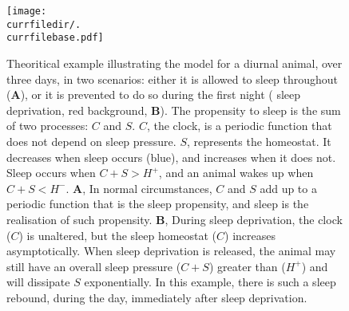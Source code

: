 \begin{figure}[h!]
  \centering   
   \texttt{[image: \\currfiledir/.\\currfilebase.pdf]}
  \caption[The two-processes model of sleep regulation]{
	Theoritical example illustrating the model for a diurnal animal, over three days, in two scenarios:
	either it is allowed to sleep throughout (\textbf{A}), or it is prevented to do so during the first night (\ie{} sleep deprivation, red background, \textbf{B}).
	The propensity to sleep is the sum of two processes: $C$ and $S$. $C$, the clock, is a periodic function that does not depend on sleep pressure.
	$S$, represents the homeostat. It decreases when sleep occurs (blue), and increases when it does not.
	Sleep occurs when $C+S > H^+$, and an animal wakes up when $C+S < H^-$.
  	\textbf{A}, In normal circumstances, $C$ and $S$ add up to a periodic function that is the sleep propensity, and sleep is the realisation of such propensity.
  	\textbf{B}, During sleep deprivation, the clock ($C$) is unaltered, but the sleep homeostat ($C$) increases asymptotically. 
	When sleep deprivation is released, the animal may still have an overall sleep pressure ($C+S$) greater than ($H^+$) and will dissipate $S$ exponentially.
	In this example, there is such a sleep rebound, during the day, immediately after sleep deprivation.
  \label{fig:\currfilebase}
  }
\end{figure}





